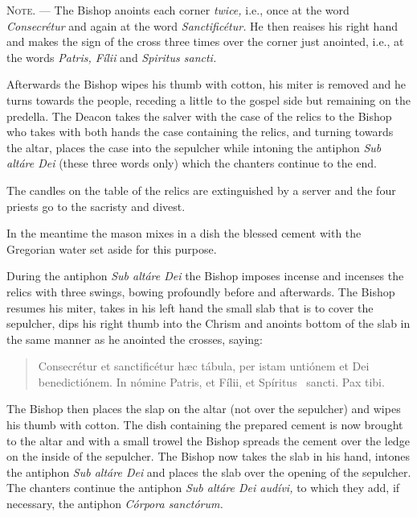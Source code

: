\documentclass[letterpaper]{report}
\begin{document}
{    \textsc{Note. ---} The Bishop anoints each corner \textit{twice,} i.e.,
    once at the word \textit{Consecr\'etur} and again at the word
    \textit{Sanctific\'etur.} He then reaises his right hand and makes the sign
    of the cross three times over the corner just anointed, i.e., at the words
    \textit{Patris, F\'ilii} and \textit{Spiritus sancti.}

    \rubric Afterwards the Bishop wipes his thumb with cotton, his miter is
    removed and he turns towards the people, receding a little to the gospel
    side but remaining on the predella. The Deacon takes the salver with the
    case of the relics to the Bishop who takes with both hands the case
    containing the relics, and turning towards the altar, places the case into
    the sepulcher while intoning the antiphon \textit{Sub alt\'are Dei} (these
    three words only) which the chanters continue to the end.

    The candles on the table of the relics are extinguished by a server and the
    four priests go to the sacristy and divest.

    In the meantime the mason mixes in a dish the blessed cement with the
    Gregorian water set aside for this purpose.

    \rubric During the antiphon \textit{Sub alt\'are Dei} the Bishop imposes
    incense and incenses the relics with three swings, bowing profoundly before
    and afterwards. The Bishop resumes his miter, takes in his left hand the
    small slab that is to cover the sepulcher, dips his right thumb into the
    Chrism and anoints bottom of the slab in the same manner as he anointed the
    crosses, saying:

    \begin{quote}
        Conse\cross crétur et sancti\cross ficétur h\ae c tábula, per istam
        untiónem et Dei benedictiónem. In nómine Pa\cross tris, et Fí\cross lii, et
        Spíritus \cross\ sancti. Pax tibi.
    \end{quote}

    \rubric The Bishop then places the slap on the altar (not over the
    sepulcher) and wipes his thumb with cotton. The dish containing the
    prepared cement is now brought to the altar and with a small trowel the
    Bishop spreads the cement over the ledge on the inside of the sepulcher.
    The Bishop now takes the slab in his hand, intones the antiphon \textit{Sub
    alt\'are Dei} and places the slab over the opening of the sepulcher. The
    chanters continue the antiphon \textit{Sub alt\'are Dei aud\'ivi,} to which
    they add, if necessary, the antiphon \textit{C\'orpora sanct\'orum.}

}
\end{document}
